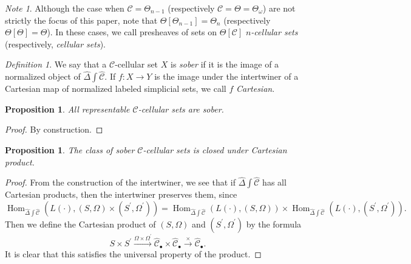 \documentclass[leqno]{article}
\numberwithin{equation}{subsection}
\theoremstyle{plain}   %
\newtheorem{prop}[equation]{Proposition}
\theoremstyle{remark}
\newtheorem{note}[equation]{Note}
\newtheorem{defn}[equation]{Definition}
\theoremstyle{plain}
\DeclareMathOperator{\Hom}{Hom}
\newcommand{\psh}[1]{\ensuremath{\widehat{#1}}}
\providecommand{\C}{}
\renewcommand{\C}{\ensuremath{\mathcal{C}}}
\newcommand{\ssetlab}{\ensuremath{\widehat{\Delta} \int \widehat{\mathcal{C}}}}
\begin{document}
\begin{note} Although the case when \(\C=\Theta_{n-1}\) (respectively \(\C=\Theta=\Theta_\omega\)) are not strictly the focus of this paper, note that \(\Theta[\Theta_{n-1}]=\Theta_n\) (respectively \(\Theta[\Theta]=\Theta\)).  In these cases, we call presheaves of sets on \(\Theta[\C]\) \emph{\(n\)-cellular sets} (respectively, \emph{cellular sets}).  
\end{note}

\begin{defn} We say that a \(\C\)-cellular set \(X\) is \emph{sober} if it is the image of a normalized object of \(\ssetlab\). If \(f:X\to Y\) is the image under the intertwiner of a Cartesian map of normalized labeled simplicial sets, we call \(f\) \emph{Cartesian}.
\end{defn}

\begin{prop} All representable \(\C\)-cellular sets are sober.
\end{prop}
\begin{proof} By construction.
\end{proof}

\begin{prop} The class of sober \(\C\)-cellular sets is closed under Cartesian product.
\end{prop}
\begin{proof} From the construction of the intertwiner, we see that if \(\ssetlab\) has all Cartesian products, then the intertwiner preserves them, since
	\[\Hom_{\ssetlab}(L(\cdot), (S,\Omega)\times (S^\prime,\Omega^\prime))=\Hom_{\ssetlab}(L(\cdot), (S,\Omega))\times \Hom_{\ssetlab}(L(\cdot), (S^\prime,\Omega^\prime)).\] Then we define the Cartesian product of \((S,\Omega)\) and \((S^\prime,\Omega^\prime)\) by the formula \[S\times S^\prime \xrightarrow{\Omega \times \Omega^\prime} \psh{\C}_\bullet \times \psh{\C}_\bullet \xrightarrow{\times} \psh{\C}_\bullet.\]  It is clear that this satisfies the universal property of the product.
\end{proof}
\end{document}
